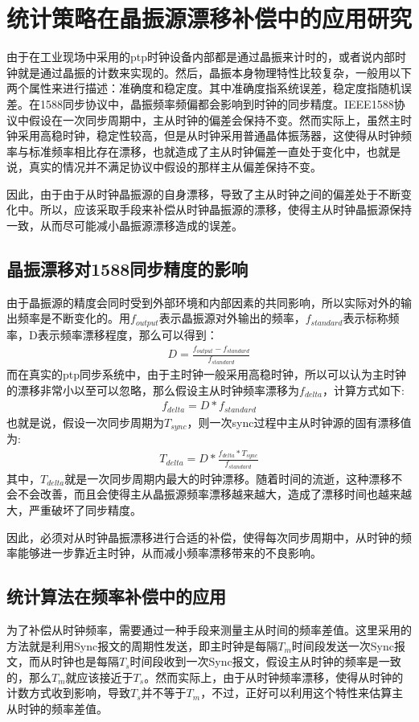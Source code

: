 \section{统计策略在晶振源漂移补偿中的应用研究}
由于在工业现场中采用的ptp时钟设备内部都是通过晶振来计时的，或者说内部时钟就是通过晶振的计数来实现的。然后，晶振本身物理特性比较复杂，一般用以下两个属性来进行描述：准确度和稳定度。其中准确度指系统误差，稳定度指随机误差。在1588同步协议中，晶振频率频偏都会影响到时钟的同步精度。IEEE1588协议中假设在一次同步周期中，主从时钟的偏差会保持不变。然而实际上，虽然主时钟采用高稳时钟，稳定性较高，但是从时钟采用普通晶体振荡器，这使得从时钟频率与标准频率相比存在漂移，也就造成了主从时钟偏差一直处于变化中，也就是说，真实的情况并不满足协议中假设的那样主从偏差保持不变。

因此，由于由于从时钟晶振源的自身漂移，导致了主从时钟之间的偏差处于不断变化中。所以，应该采取手段来补偿从时钟晶振源的漂移，使得主从时钟晶振源保持一致，从而尽可能减小晶振源漂移造成的误差。

\subsection{晶振漂移对1588同步精度的影响}
由于晶振源的精度会同时受到外部环境和内部因素的共同影响，所以实际对外的输出频率是不断变化的。用$f_{output}$表示晶振源对外输出的频率，$f_{standard}$表示标称频率，D表示频率漂移程度，那么可以得到：
\begin {align}
D = \frac{f_{output} - f_{standard}}{f_{standard}}
\end{align}
而在真实的ptp同步系统中，由于主时钟一般采用高稳时钟，所以可以认为主时钟的漂移非常小以至可以忽略，那么假设主从时钟频率漂移为$f_{delta}$，计算方式如下:
\begin {align}
f_{delta} = D * f_{standard}
\end{align}
也就是说，假设一次同步周期为$T_{sync}$，则一次sync过程中主从时钟源的固有漂移值为:
\begin {align}
T_{delta} = D * \frac{f_{delta} * T_{sync}}{f_{standard}}
\end{align}
其中，$T_{delta}$就是一次同步周期内最大的时钟漂移。随着时间的流逝，这种漂移不会不会改善，而且会使得主从晶振源频率漂移越来越大，造成了漂移时间也越来越大，严重破坏了同步精度。

因此，必须对从时钟晶振漂移进行合适的补偿，使得每次同步周期中，从时钟的频率能够进一步靠近主时钟，从而减小频率漂移带来的不良影响。

\subsection{统计算法在频率补偿中的应用}
为了补偿从时钟频率，需要通过一种手段来测量主从时间的频率差值。这里采用的方法就是利用Sync报文的周期性发送，即主时钟是每隔$T_{m}$时间段发送一次Sync报文，而从时钟也是每隔$T_{s}$时间段收到一次Sync报文，假设主从时钟的频率是一致的，那么$T_{m}$就应该接近于$T_{s}$。然而实际上，由于从时钟频率漂移，使得从时钟的计数方式收到影响，导致$T_{s}$并不等于$T_{m}$，不过，正好可以利用这个特性来估算主从时钟的频率差值。

